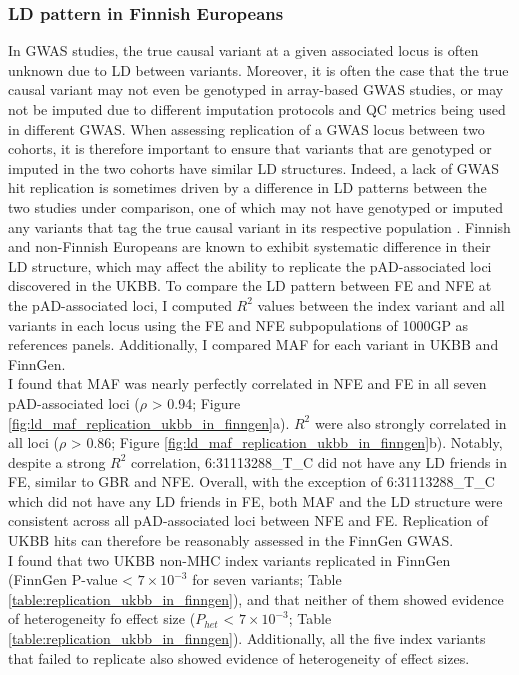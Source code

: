 \subsubsection{LD pattern in Finnish Europeans}
In GWAS studies, the true causal variant at a given associated locus is often unknown due to LD between variants. Moreover, it is often the case that the true causal variant may not even be genotyped in array-based GWAS studies, or may not be imputed due to different imputation protocols and QC metrics being used in different GWAS. When assessing replication of a GWAS locus between two cohorts, it is therefore important to ensure that variants that are genotyped or imputed in the two cohorts have similar LD structures. Indeed, a lack of GWAS hit replication is sometimes driven by a difference in LD patterns between the two studies under comparison, one of which may not have genotyped or imputed any variants that tag the true causal variant in its respective population \cite{Kraft2009-xg}. Finnish and non-Finnish Europeans are known to exhibit systematic difference in their LD structure, which may affect the ability to replicate the pAD-associated loci discovered in the UKBB. To compare the LD pattern between FE and NFE at the pAD-associated loci, I computed $R^{2}$ values between the index variant and all variants in each locus using the FE and NFE subpopulations of 1000GP as references panels. Additionally, I compared MAF for each variant in UKBB and FinnGen.\\

I found that MAF was nearly perfectly correlated in NFE and FE in all seven pAD-associated loci ($\rho$ > 0.94; Figure \ref{fig:ld_maf_replication_ukbb_in_finngen}a). $R^{2}$ were also strongly correlated in all loci ($\rho$ > 0.86; Figure \ref{fig:ld_maf_replication_ukbb_in_finngen}b). Notably, despite a strong $R^{2}$ correlation, 6:31113288\_T\_C did not have any LD friends in FE, similar to GBR and NFE. Overall, with the exception of 6:31113288\_T\_C which did not have any LD friends in FE, both MAF and the LD structure were consistent across all pAD-associated loci between NFE and FE. Replication of UKBB hits can therefore be reasonably assessed in the FinnGen GWAS.\\

I found that two UKBB non-MHC index variants replicated in FinnGen (FinnGen P-value < $7\times10^{-3}$ for seven variants; Table \ref{table:replication_ukbb_in_finngen}), and that neither of them showed evidence of heterogeneity fo effect size ($P_{het}$ < $7\times10^{-3}$; Table \ref{table:replication_ukbb_in_finngen}). Additionally, all the five index variants that failed to replicate also showed evidence of heterogeneity of effect sizes. 



